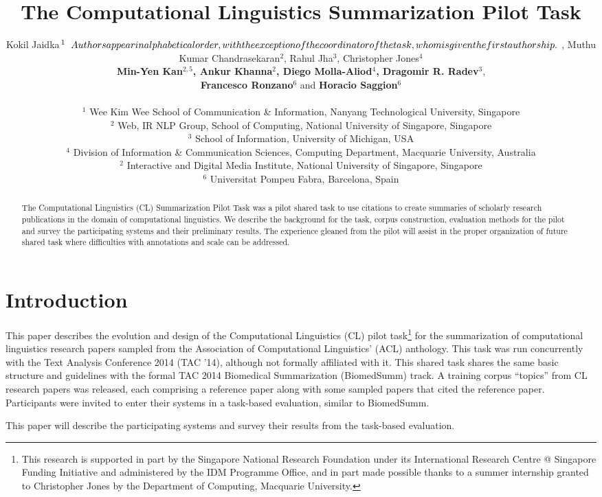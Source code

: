 \documentclass[11pt]{article}
\title{The Computational Linguistics Summarization Pilot Task}
\author{Kokil Jaidka$^{1}\relax{\hspace{.2cm}Authors appear in alphabetical order, with the exception of the coordinator of the task, whom is given the first authorship.} $ , Muthu Kumar Chandrasekaran$^{2}$, Rahul Jha$^{3}$, Christopher Jones$^{4}$ \\ {\bf Min-Yen Kan}$^{2,5}${\bf , Ankur Khanna}$^{2}${\bf , Diego Molla-Aliod}$^{4}${\bf , Dragomir R. Radev}$^{3}$, \\ {\bf Francesco Ronzano}$^{6}$ and {\bf Horacio Saggion}$^{6}$ \\ 
\\
$^1$ Wee Kim Wee School of Communication \& Information, Nanyang Technological University, Singapore \\
$^2$ Web, IR \/ NLP Group, School of Computing, National University of Singapore, Singapore \\
$^3$ School of Information, University of Michigan, USA\\
$^4$ Division of Information \& Communication Sciences, Computing Department, Macquarie University, Australia \\
$^2$ Interactive and Digital Media Institute, National University of Singapore, Singapore \\
$^6$ Universitat Pompeu Fabra, Barcelona, Spain }
\date{}
\begin{document}
\maketitle
\begin{abstract}
The Computational Linguistics (CL) Summarization Pilot Task was a
pilot shared task to use citations to create summaries of scholarly
research publications in the domain of computational linguistics.  We
describe the background for the task, corpus construction, evaluation
methods for the pilot and survey the participating systems and their
preliminary results.  The experience gleaned from the pilot will
assist in the proper organization of future shared task where
difficulties with annotations and scale can be addressed.
\end{abstract}

\section{Introduction}

This paper describes the evolution and design of the Computational
Linguistics (CL) pilot task\footnote{This research is supported in
  part by the Singapore National Research Foundation under its
  International Research Centre @ Singapore Funding Initiative and
  administered by the IDM Programme Office, and in part made possible
  thanks to a summer internship granted to Christopher Jones by the
  Department of Computing, Macquarie University.} for the
summarization of computational linguistics research papers sampled
from the Association of Computational Linguistics' (ACL)
anthology. This task was run concurrently with the Text Analysis
Conference 2014 (TAC '14), although not formally affiliated with it.
This shared task shares the same basic structure and guidelines with
the formal TAC 2014 Biomedical Summarization (BiomedSumm) track. A
training corpus ``topics'' from CL research papers was released, each
comprising a reference paper along with some sampled papers that cited
the reference paper. Participants were invited to enter their systems
in a task-based evaluation, similar to BiomedSumm.

This paper will describe the participating systems and survey their 
results from the task-based evaluation.
\end{document}
